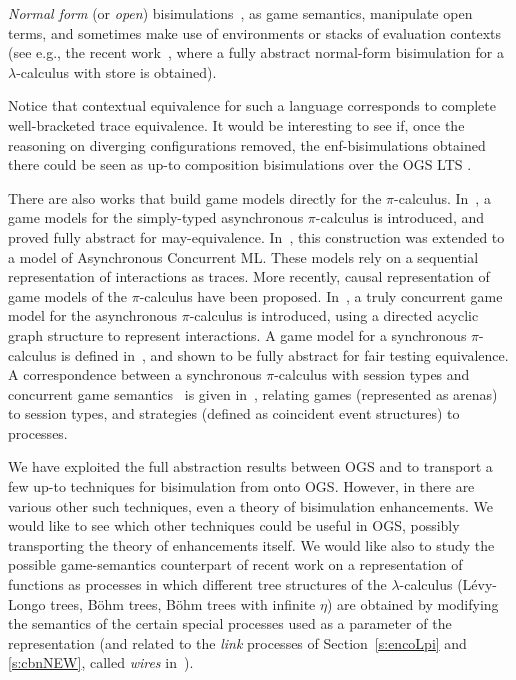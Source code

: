 \emph{Normal form} (or \emph{open}) bisimulations~\cite{lassentrees,Stovring-Lassen},
as game
semantics, 
manipulate open terms, and sometimes make use of
environments or stacks of evaluation contexts (see e.g., the recent
work~\cite{biernacki2019complete}, where  a fully abstract  normal-form 
bisimulation for a $\lambda$-calculus with store is obtained).  

Notice that contextual equivalence for such a language corresponds to complete well-bracketed 
trace equivalence.
It would be interesting to see if, once the reasoning on diverging configurations removed,
the enf-bisimulations obtained there could be seen as up-to composition bisimulations
over the OGS LTS .

There are also works that build
game models directly for the $\pi$-calculus.
In~\cite{laird2005game}, a game models for the simply-typed asynchronous $\pi$-calculus 
is introduced, and proved fully abstract for may-equivalence.
In~\cite{10.1007/11944836_38}, this construction was extended to a model of Asynchronous Concurrent ML.
These models rely on a sequential representation of interactions as traces.
More recently, causal representation of game models of the $\pi$-calculus have been proposed.
In~\cite{sakayori2017truly}, a truly concurrent game model for the asynchronous $\pi$-calculus is introduced,
using a directed acyclic graph structure to represent interactions.
%
A game model for a synchronous $\pi$-calculus is defined in~\cite{eberhart2015intensionally}, and shown to
be fully abstract for fair testing equivalence. 
A correspondence between a synchronous $\pi$-calculus with session types and 
concurrent game semantics~\cite{winskel2017games}
is given in~\cite{10.1145/3290340}, relating 
games (represented as arenas) to  session types, and 
strategies (defined as coincident event structures) to processes.


We have exploited the full abstraction results between OGS and \piI
 to transport a few  up-to techniques for
  bisimulation  from
  \piI onto OGS.  However, in \piI there are various other such techniques, even a theory of
 bisimulation enhancements.  We would like to see which other techniques could be useful
 in OGS,  possibly transporting  the theory of enhancements itself. 
We would like also to study the possible game-semantics counterpart of recent work on a
 representation of functions as processes \cite{SakayoriS23} in which different tree structures of the
$\lambda$-calculus (Lévy-Longo  trees,  Böhm trees,  Böhm trees with infinite $\eta$) are obtained
by modifying the semantics of the certain special processes used as a parameter of the
representation
 (and related to the \emph{link} processes of
Section~\ref{s:encoLpi} and \ref{s:cbnNEW}, called \emph{wires} in~\cite{SakayoriS23}). 


